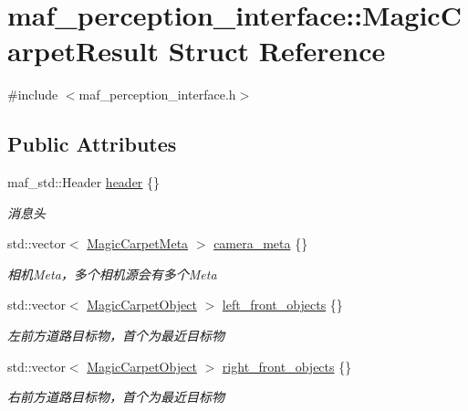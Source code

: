 \hypertarget{structmaf__perception__interface_1_1MagicCarpetResult}{}\section{maf\+\_\+perception\+\_\+interface\+:\+:Magic\+Carpet\+Result Struct Reference}
\label{structmaf__perception__interface_1_1MagicCarpetResult}


{\ttfamily \#include $<$maf\+\_\+perception\+\_\+interface.\+h$>$}

\subsection*{Public Attributes}
\begin{DoxyCompactItemize}
\item 
maf\+\_\+std\+::\+Header \hyperlink{structmaf__perception__interface_1_1MagicCarpetResult_a98ccdffc14abc9edb82157abfd099df1}{header} \{\}
\begin{DoxyCompactList}\small\item\em 消息头 \end{DoxyCompactList}\item 
std\+::vector$<$ \hyperlink{structmaf__perception__interface_1_1MagicCarpetMeta}{Magic\+Carpet\+Meta} $>$ \hyperlink{structmaf__perception__interface_1_1MagicCarpetResult_a8789b70501b926a9abe9501acf96c323}{camera\+\_\+meta} \{\}
\begin{DoxyCompactList}\small\item\em 相机\+Meta，多个相机源会有多个\+Meta \end{DoxyCompactList}\item 
std\+::vector$<$ \hyperlink{structmaf__perception__interface_1_1MagicCarpetObject}{Magic\+Carpet\+Object} $>$ \hyperlink{structmaf__perception__interface_1_1MagicCarpetResult_ab7a37523b3b06dd9c8330a1970ad607b}{left\+\_\+front\+\_\+objects} \{\}
\begin{DoxyCompactList}\small\item\em 左前方道路目标物，首个为最近目标物 \end{DoxyCompactList}\item 
std\+::vector$<$ \hyperlink{structmaf__perception__interface_1_1MagicCarpetObject}{Magic\+Carpet\+Object} $>$ \hyperlink{structmaf__perception__interface_1_1MagicCarpetResult_afccb6e5f5cbf6a26748b255db5ce4619}{right\+\_\+front\+\_\+objects} \{\}
\begin{DoxyCompactList}\small\item\em 右前方道路目标物，首个为最近目标物 \end{DoxyCompactList}\item 

\end{DoxyCompactItemize}
